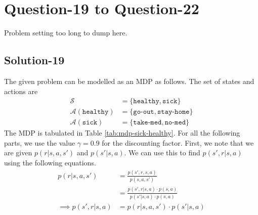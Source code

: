 \documentclass[11pt]{article}
\begin{document}
    \section*{Question-19 to Question-22}
    Problem setting too long to dump here.

    \subsection*{Solution-19}
    The given problem can be modelled as an MDP as follows. The set of states and actions are
    \begin{align*}
        \mathcal{S} &= \{ \texttt{healthy}, \texttt{sick} \} \\
        \mathcal{A(\texttt{healthy})} &= \{ \texttt{go-out}, \texttt{stay-home} \} \\
        \mathcal{A(\texttt{sick})} &= \{ \texttt{take-med}, \texttt{no-med} \}
    \end{align*}
    The MDP is tabulated in Table \ref{tab:mdp-sick-healthy}. For all the following parts, we use
    the value $\gamma = 0.9$ for the discounting factor. First, we note that we are given $p(r | s, a, s')$
    and $p(s' | s, a)$. We can use this to find $p(s', r | s, a)$ using the following equations.
    \begin{align*}
        p(r | s, a, s') &= \frac{p(s', r, s, a)}{p(s, a, s')} \\
        &= \frac{p(s', r | s, a) \cdot p(s, a)}{p(s' | s, a) \cdot p(s, a)} \\
        \implies p(s', r | s, a) &= p(r | s, a, s') \cdot p(s' | s, a)
    \end{align*}
\end{document}
